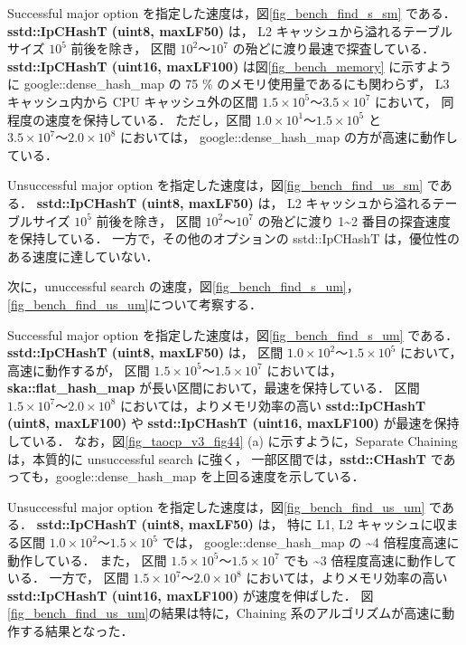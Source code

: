 Successful major option を指定した速度は，図\ref{fig_bench_find_s_sm} である．
{\bf sstd::IpCHashT (uint8, maxLF50)} は，
L2 キャッシュから溢れるテーブルサイズ $10^5$ 前後を除き，
区間 $10^2〜10^7$ の殆どに渡り最速で探査している．
{\bf sstd::IpCHashT (uint16, maxLF100)} は図\ref{fig_bench_memory} に示すように
google::dense\_hash\_map の 75 \% のメモリ使用量であるにも関わらず，
L3 キャッシュ内から CPU キャッシュ外の区間 $1.5\times10^5〜3.5\times10^7$ において，
同程度の速度を保持している．
ただし，区間 $1.0\times10^1〜1.5\times10^5$ と $3.5\times10^7〜2.0\times10^8$ においては，
google::dense\_hash\_map の方が高速に動作している．

Unsuccessful major option を指定した速度は，図\ref{fig_bench_find_us_sm} である．
{\bf sstd::IpCHashT (uint8, maxLF50)} は，
L2 キャッシュから溢れるテーブルサイズ $10^5$ 前後を除き，
区間 $10^2〜10^7$ の殆どに渡り 1\textasciitilde 2 番目の探査速度を保持している．
一方で，その他のオプションの sstd::IpCHashT は，優位性のある速度に達していない．

次に，unuccessful search の速度，図\ref{fig_bench_find_s_um}，\ref{fig_bench_find_us_um}について考察する．

Successful major option を指定した速度は，図\ref{fig_bench_find_s_um} である．
{\bf sstd::IpCHashT (uint8, maxLF50)} は，
区間 $1.0\times10^2〜1.5\times10^5$ において，高速に動作するが，
区間 $1.5\times10^5〜1.5\times10^7$ においては，{\bf ska::flat\_hash\_map} が長い区間において，最速を保持している．
区間 $1.5\times10^7〜2.0\times10^8$ においては，よりメモリ効率の高い
{\bf sstd::IpCHashT (uint8, maxLF100)} や {\bf sstd::IpCHashT (uint16, maxLF100)} が最速を保持している．
なお，図\ref{fig_taocp_v3_fig44} (a) に示すように，Separate Chaining は，本質的に unsuccessful search に強く，
一部区間では，{\bf sstd::CHashT} であっても，google::dense\_hash\_map を上回る速度を示している．

Unsuccessful major option を指定した速度は，図\ref{fig_bench_find_us_um} である．
{\bf sstd::IpCHashT (uint8, maxLF50)} は，
特に L1, L2 キャッシュに収まる区間 $1.0\times10^2〜1.5\times10^5$ では，
google::dense\_hash\_map の \textasciitilde4 倍程度高速に動作している．
また，
区間 $1.5\times10^5〜1.5\times10^7$ でも \textasciitilde3 倍程度高速に動作している．
一方で，
区間 $1.5\times10^7〜2.0\times10^8$ においては，よりメモリ効率の高い {\bf sstd::IpCHashT (uint16, maxLF100)} が速度を伸ばした．
図\ref{fig_bench_find_us_um}の結果は特に，Chaining 系のアルゴリズムが高速に動作する結果となった．
\leavevmode \newline

